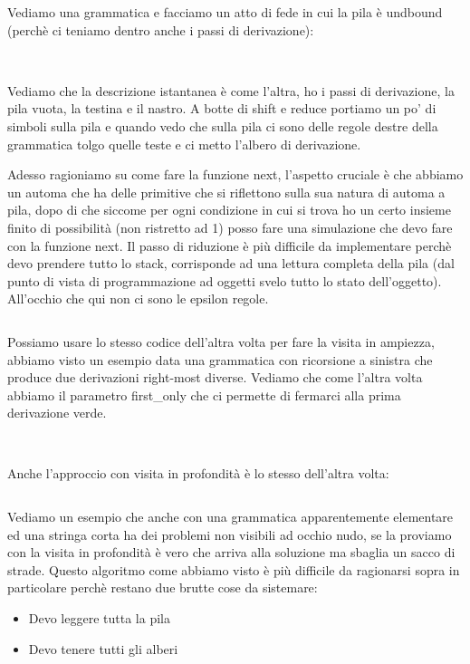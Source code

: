 Vediamo una grammatica e facciamo un atto di fede in cui la pila è undbound (perchè ci teniamo dentro anche i passi di derivazione):
\begin{lstlisting}
  
\end{lstlisting}
Vediamo che la descrizione istantanea è come l'altra, ho i passi di derivazione, la pila vuota, la testina e il nastro.
A botte di shift e reduce portiamo un po' di simboli sulla pila e quando vedo che sulla pila ci sono delle regole destre della grammatica tolgo quelle teste e ci metto l'albero di derivazione.

Adesso ragioniamo su come fare la funzione next, l'aspetto cruciale è che abbiamo un automa che ha delle primitive che si riflettono sulla sua natura di automa a pila, dopo di che siccome per ogni condizione in cui si trova ho un certo insieme finito di possibilità (non ristretto ad 1) posso fare una simulazione che devo fare con la funzione next.
Il passo di riduzione è più difficile da implementare perchè devo prendere tutto lo stack, corrisponde ad una lettura completa della pila (dal punto di vista di programmazione ad oggetti svelo tutto lo stato dell'oggetto). All'occhio che qui non ci sono le epsilon regole.

\begin{lstlisting}
\end{lstlisting}

Possiamo usare lo stesso codice dell'altra volta per fare la visita in ampiezza, abbiamo visto un esempio data una grammatica con ricorsione a sinistra che produce due derivazioni right-most diverse. Vediamo che come l'altra volta abbiamo il parametro first\_only che ci permette di fermarci alla prima derivazione verde.

\begin{lstlisting}
  
\end{lstlisting}

Anche l'approccio con visita in profondità è lo stesso dell'altra volta:
\begin{lstlisting}
\end{lstlisting}

Vediamo un esempio che anche con una grammatica apparentemente elementare ed una stringa corta ha dei problemi non visibili ad occhio nudo, se la proviamo con la visita in profondità è vero che arriva alla soluzione ma sbaglia un sacco di strade.
Questo algoritmo come abbiamo visto è più difficile da ragionarsi sopra in particolare perchè restano due brutte cose da sistemare:
\begin{itemize}
  \item Devo leggere tutta la pila
  \item Devo tenere tutti gli alberi
\end{itemize}

